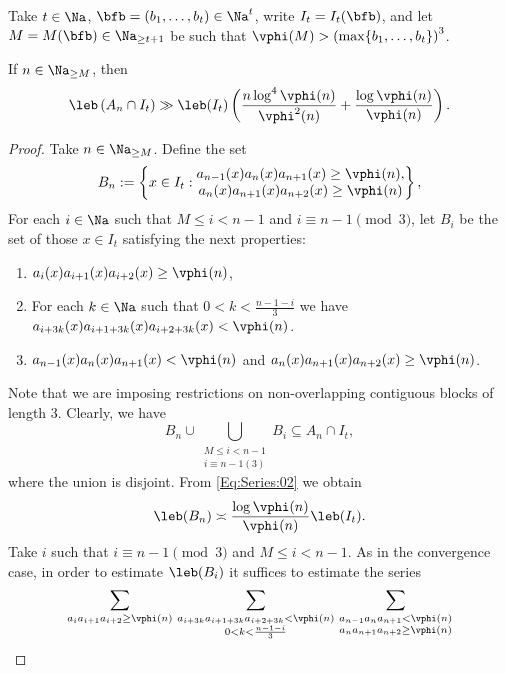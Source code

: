 \documentclass[12pt,a4paper]{amsart}
\begin{document}
Take $t\in\Na$, $\bfb=(b_1,\ldots, b_t)\in \Na^t$, write $I_t=I_t(\bfb)$, and let $M=M(\bfb)\in\Na_{\geq t+1}$ be such that $\vphi(M)>\left(\max\{b_1,\ldots, b_t\}\right)^{3}$.
\begin{lem01}\label{Lem:Divergence:01}
If $n\in\Na_{\geq M}$, then
\[
\leb\left( A_n\cap I_t\right)
\gg 
\leb(I_t)
\left( 
\frac{n\log^{4}\vphi(n)}{\vphi^2(n)} 
+  
\frac{\log\vphi(n)}{\vphi(n)} 
\right).
\]
\end{lem01}
\begin{proof}
{
Take $n\in\Na_{\geq M}$. Define the set
\[
B_{n}
:=
\left\{x\in I_t: 
\begin{matrix}
a_{n-1}(x)a_{n}(x)a_{n+1}(x) \geq \vphi(n), \\ 
a_{n}(x)a_{n+1}(x)a_{n+2}(x) \geq \vphi(n)
\end{matrix}
\right\},
\]
For each $i\in\Na$ such that $M\leq i<n-1$ and $i\equiv n-1 \pmod 3$, let $B_i$ be the set of those $x\in I_t$ satisfying the next properties:
\begin{enumerate}[1.]
\item $a_{i}(x)a_{i+1}(x)a_{i+2}(x) \geq \vphi(n)$, 
\item For each $k\in\Na$ such that $0< k < \frac{n-1-i}{3}$ we have $a_{i+3k}(x)a_{i+1+3k}(x)a_{i+2+3k}(x) < \vphi(n)$.
 \item $a_{n-1}(x)a_{n}(x)a_{n+1}(x) <\vphi(n)$ and $a_{n}(x)a_{n+1}(x)a_{n+2}(x) \geq \vphi(n)$.
\end{enumerate}
Note that we are imposing restrictions on non-overlapping contiguous blocks of length $3$. Clearly, we have 
\begin{equation}\label{Eq:Conten}
B_n\cup \bigcup_{\substack{M\leq  i<n-1\\ i\equiv n-1 (3)}} B_i
\subseteq
A_n\cap I_t,
\end{equation}
where the union is disjoint. From \eqref{Eq:Series:02} we obtain
\begin{equation}\label{Eq:BndBn}
\leb (B_n)
\asymp
\frac{\log\vphi(n)}{\vphi(n)}
\leb(I_t).
\end{equation}
Take $i$ such that $i\equiv n-1\pmod 3$ and $M\leq  i<n-1$. As in the convergence case, in order to estimate $\leb(B_i)$ it suffices to estimate the series
\[
\sum_{a_ia_{i+1} a_{i+2}\geq \vphi(n)} \,
\sum_{\substack{a_{i+3k}a_{i+1+3k}a_{i+2+3k } < \vphi(n) \\ 0<k<\frac{n-1-i}{3}}}\,
\sum_{\substack{a_{n-1}a_{n}a_{n+1} < \vphi(n) \\ a_{n}a_{n+1}a_{n+2} \geq  \vphi(n)}} 
\]}
\end{proof}
\end{document}
